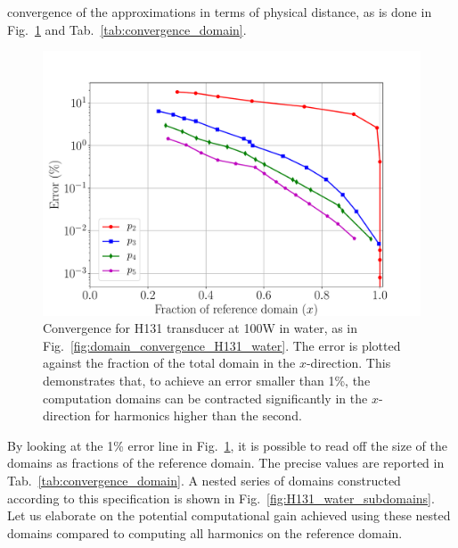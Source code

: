 \documentclass[11pt]{article}
\numberwithin{equation}{section}
\begin{document}
convergence of the approximations in terms of physical distance, as is done in 
Fig.~\ref{fig:domain_convergence_in_space_H131_water} and Tab.~\ref{tab:convergence_domain}.
\begin{figure}[h!]
    \centering
    \includegraphics[width=\linewidth]{Figure9}
    \caption{Convergence for H131 transducer at 100W in water, as in Fig.~\ref{fig:domain_convergence_H131_water}.
    The error is plotted against the fraction of the total domain in the $x$-direction.
    This demonstrates that, to achieve an error smaller than 1\%, the computation 
    domains can be contracted significantly in the $x$-direction for harmonics higher than the second.}
    \label{fig:domain_convergence_in_space_H131_water}
\end{figure}

By looking at the 1\% error line in Fig.~\ref{fig:domain_convergence_in_space_H131_water},
it is possible to read off the size of the domains as fractions of the reference
domain. The precise values are reported in Tab.~\ref{tab:convergence_domain}.
A nested series of domains constructed according to this specification is shown 
in Fig.~\ref{fig:H131_water_subdomains}. Let us elaborate on the potential 
computational gain achieved using these nested domains compared to computing 
all harmonics on the reference domain.
\end{document}
